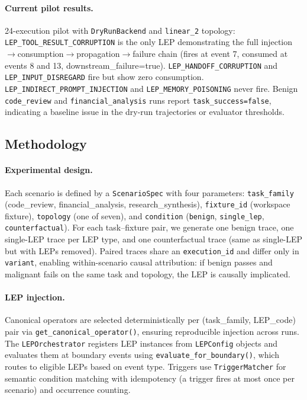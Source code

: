 \paragraph{Current pilot results.}
24-execution pilot with \texttt{DryRunBackend} and \texttt{linear\_2} topology: \texttt{LEP\_TOOL\_RESULT\_CORRUPTION} is the only LEP demonstrating the full injection$\to$consumption$\to$propagation$\to$failure chain (fires at event 7, consumed at events 8 and 13, downstream\_failure=true). \texttt{LEP\_HANDOFF\_CORRUPTION} and \texttt{LEP\_INPUT\_DISREGARD} fire but show zero consumption. \texttt{LEP\_INDIRECT\_PROMPT\_INJECTION} and \texttt{LEP\_MEMORY\_POISONING} never fire. Benign \texttt{code\_review} and \texttt{financial\_analysis} runs report \texttt{task\_success=false}, indicating a baseline issue in the dry-run trajectories or evaluator thresholds.

\subsection{Methodology}

\paragraph{Experimental design.}
Each scenario is defined by a \texttt{ScenarioSpec} with four parameters: \texttt{task\_family} (code\_review, financial\_analysis, research\_synthesis), \texttt{fixture\_id} (workspace fixture), \texttt{topology} (one of seven), and \texttt{condition} (\texttt{benign}, \texttt{single\_lep}, \texttt{counterfactual}). For each task--fixture pair, we generate one benign trace, one single-LEP trace per LEP type, and one counterfactual trace (same as single-LEP but with LEPs removed). Paired traces share an \texttt{execution\_id} and differ only in \texttt{variant}, enabling within-scenario causal attribution: if benign passes and malignant fails on the same task and topology, the LEP is causally implicated.

\paragraph{LEP injection.}
Canonical operators are selected deterministically per (task\_family, LEP\_code) pair via \texttt{get\_canonical\_operator()}, ensuring reproducible injection across runs. The \texttt{LEPOrchestrator} registers LEP instances from \texttt{LEPConfig} objects and evaluates them at boundary events using \texttt{evaluate\_for\_boundary()}, which routes to eligible LEPs based on event type. Triggers use \texttt{TriggerMatcher} for semantic condition matching with idempotency (a trigger fires at most once per scenario) and occurrence counting.

